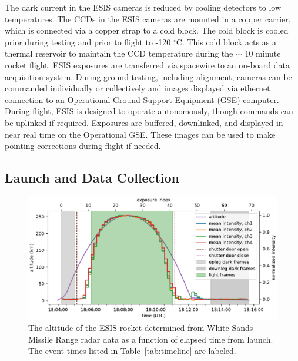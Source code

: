     	
        The dark current in the ESIS cameras is reduced by cooling detectors to low temperatures. 
        The CCDs in the ESIS cameras are mounted in a copper carrier, which is connected via a copper strap to a cold block.  
        The cold block is cooled prior during testing and prior to flight to -120 $^{\circ}$C.  This cold block acts as a thermal reservoir to maintain the CCD temperature during the $\sim$ 10 minute rocket flight.   
        ESIS exposures are transferred via spacewire to an on-board data acquisition system. During ground testing, including alignment, cameras can be commanded individually or collectively and images displayed via ethernet connection to an Operational Ground Support Equipment (GSE) computer.  
        During flight, ESIS is designed to operate autonomously, though commands can be uplinked if required.  
        Exposures are buffered, downlinked, and displayed in near real time on the Operational GSE.   These images can be used to make pointing corrections during flight if needed. 
	
    
	\subsection{Launch and Data Collection} 
		\begin{figure}[ht]
			\begin{center}
				\includegraphics{figures/signal_and_altitude_vs_time}
				\caption{The altitude of the ESIS rocket determined from White Sands Missile Range radar data as a function of elapsed time from launch.  The event times listed in Table~\ref{tab:timeline} are labeled.}
				\label{fig:timeline}
			\end{center}
		\end{figure}

